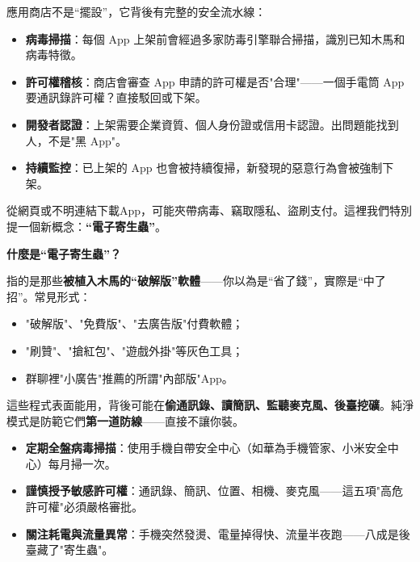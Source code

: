 
應用商店不是“擺設”，它背後有完整的安全流水線：

\begin{itemize}
  \item \textbf{病毒掃描}：每個 App 上架前會經過多家防毒引擎聯合掃描，識別已知木馬和病毒特徵。
  \item \textbf{許可權稽核}：商店會審查 App 申請的許可權是否"合理"——一個手電筒 App 要通訊錄許可權？直接駁回或下架。
  \item \textbf{開發者認證}：上架需要企業資質、個人身份證或信用卡認證。出問題能找到人，不是"黑 App"。
  \item \textbf{持續監控}：已上架的 App 也會被持續復掃，新發現的惡意行為會被強制下架。
\end{itemize}


從網頁或不明連結下載App，可能夾帶病毒、竊取隱私、盜刷支付。這裡我們特別提一個新概念：\textbf{“電子寄生蟲”}。

\textbf{什麼是“電子寄生蟲”？}\par

指的是那些\textbf{被植入木馬的“破解版”軟體}——你以為是“省了錢”，實際是“中了招”。常見形式：

\begin{itemize}
  \item "破解版"、"免費版"、"去廣告版"付費軟體；
  \item "刷贊"、"搶紅包"、"遊戲外掛"等灰色工具；
  \item 群聊裡"小廣告"推薦的所謂"內部版"App。
\end{itemize}

這些程式表面能用，背後可能在\textbf{偷通訊錄、讀簡訊、監聽麥克風、後臺挖礦}。純淨模式是防範它們\textbf{第一道防線}——直接不讓你裝。


\begin{itemize}
  \item \textbf{定期全盤病毒掃描}：使用手機自帶安全中心（如華為手機管家、小米安全中心）每月掃一次。
  \item \textbf{謹慎授予敏感許可權}：通訊錄、簡訊、位置、相機、麥克風——這五項"高危許可權"必須嚴格審批。
  \item \textbf{關注耗電與流量異常}：手機突然發燙、電量掉得快、流量半夜跑——八成是後臺藏了"寄生蟲"。
\end{itemize}

